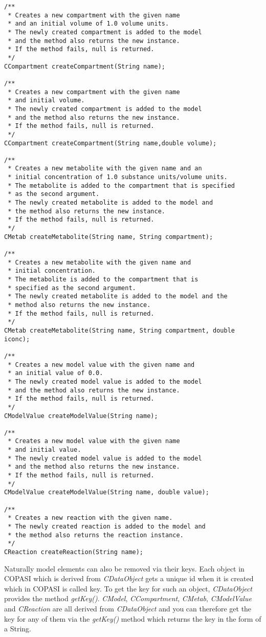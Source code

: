 \documentclass[a4,10pt]{article}
\begin{document}
\begin{lstlisting}
/**
 * Creates a new compartment with the given name 
 * and an initial volume of 1.0 volume units.
 * The newly created compartment is added to the model
 * and the method also returns the new instance.
 * If the method fails, null is returned.
 */
CCompartment createCompartment(String name);

/**
 * Creates a new compartment with the given name 
 * and initial volume.
 * The newly created compartment is added to the model
 * and the method also returns the new instance.
 * If the method fails, null is returned.
 */
CCompartment createCompartment(String name,double volume);

/**
 * Creates a new metabolite with the given name and an 
 * initial concentration of 1.0 substance units/volume units.
 * The metabolite is added to the compartment that is specified
 * as the second argument.
 * The newly created metabolite is added to the model and
 * the method also returns the new instance.
 * If the method fails, null is returned.
 */
CMetab createMetabolite(String name, String compartment);

/**
 * Creates a new metabolite with the given name and 
 * initial concentration.
 * The metabolite is added to the compartment that is 
 * specified as the second argument.
 * The newly created metabolite is added to the model and the
 * method also returns the new instance.
 * If the method fails, null is returned.
 */
CMetab createMetabolite(String name, String compartment, double iconc);

/**
 * Creates a new model value with the given name and 
 * an initial value of 0.0.
 * The newly created model value is added to the model
 * and the method also returns the new instance.
 * If the method fails, null is returned.
 */
CModelValue createModelValue(String name);

/**
 * Creates a new model value with the given name 
 * and initial value.
 * The newly created model value is added to the model
 * and the method also returns the new instance.
 * If the method fails, null is returned.
 */
CModelValue createModelValue(String name, double value);

/**
 * Creates a new reaction with the given name.
 * The newly created reaction is added to the model and 
 * the method also returns the reaction instance.
 */
CReaction createReaction(String name);
\end{lstlisting}

Naturally model elements can also be removed via their keys. Each object in COPASI which is derived from \textit{CDataObject} gets a unique id when it is created which in COPASI is called key. To get the key for such an object, \textit{CDataObject} provides the method \textit{getKey()}.
\textit{CModel}, \textit{CCompartment}, \textit{CMetab}, \textit{CModelValue} and \textit{CReaction} are all derived from \textit{CDataObject} and you can therefore get the key for any of them via the \textit{getKey()} method which returns the key in the form of a String.
\end{document}
